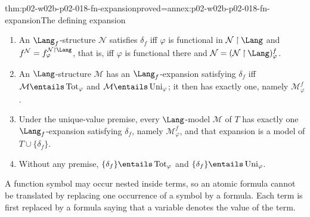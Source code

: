 \begin{hbtheorem}{thm:p02-w02b-p02-018-fn-expansion}{proved=annex:p02-w02b-p02-018-fn-expansion}{The defining expansion}
\begin{enumerate}
 \item An \(\Lang_f\)-structure \(\mathcal N\) satisfies \(\delta_f\) iff
       \(\varphi\) is functional in \(\mathcal N\mathbin{\upharpoonright}\Lang\)
       and \(f^{\mathcal N}=f^{\mathcal N\mathbin{\upharpoonright}\Lang}_{\varphi}\),
       that is, iff \(\varphi\) is functional there and
       \(\mathcal N=(\mathcal N\mathbin{\upharpoonright}\Lang)^{f}_{\varphi}\).
 \item An \(\Lang\)-structure \(\mathcal M\) has an \(\Lang_f\)-expansion
       satisfying \(\delta_f\) iff
       \(\mathcal M\entails\operatorname{Tot}_{\varphi}\) and
       \(\mathcal M\entails\operatorname{Uni}_{\varphi}\); it then has
       exactly one, namely \(\mathcal M^{f}_{\varphi}\).
 \item Under the unique-value premise, every \(\Lang\)-model \(\mathcal M\)
       of \(T\) has exactly one \(\Lang_f\)-expansion satisfying
       \(\delta_f\), namely \(\mathcal M^{f}_{\varphi}\), and that expansion
       is a model of \(T\cup\{\delta_f\}\).
 \item Without any premise,
       \(\{\delta_f\}\entails\operatorname{Tot}_{\varphi}\) and
       \(\{\delta_f\}\entails\operatorname{Uni}_{\varphi}\).
\end{enumerate}
\end{hbtheorem}

A function symbol may occur nested inside terms, so an atomic formula
cannot be translated by replacing one occurrence of a symbol by a formula.
Each term is first replaced by a formula saying that a variable denotes the
value of the term.

